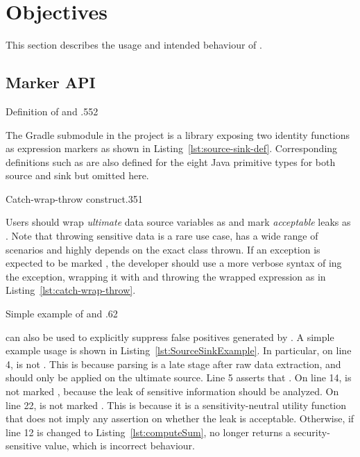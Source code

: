 \section{Objectives}\label{sec:objectives}
This section describes the usage and intended behaviour of \pname{}.

\subsection{Marker API}\label{subsec:marker-api}
{Definition of  and }{.55}{2}

The  Gradle submodule in the project
is a library exposing two identity functions as expression markers
as shown in Listing~\ref{lst:source-sink-def}.
Corresponding definitions such as 
are also defined for the eight Java primitive types
for both source and sink but omitted here.

{Catch-wrap-throw construct}{.35}{1}

Users should wrap \emph{ultimate} data source variables as 
and mark \emph{acceptable} leaks as .
Note that throwing sensitive data is a rare use case,
has a wide range of scenarios
and highly depends on the exact class thrown.
If an exception is expected to be marked ,
the developer should use a more verbose syntax of ing the exception,
wrapping it with  and throwing the wrapped expression
as in Listing~\ref{lst:catch-wrap-throw}.

{Simple example of  and }{.6}{2}

 can also be used to explicitly suppress false positives generated by \pname{}.
A simple example usage is shown in Listing~\ref{lst:SourceSinkExample}.
In particular, on line 4,  is not .
This is because parsing is a late stage after raw data extraction,
and  should only be applied on the ultimate source.
Line 5 asserts that .
On line 14,  is not marked ,
because the leak of sensitive information should be analyzed.
On line 22,  is not marked .
This is because it is a sensitivity-neutral utility function
that does not imply any assertion on whether the leak is acceptable.
Otherwise, if line 12 is changed to Listing~\ref{lst:computeSum},
 no longer returns a security-sensitive value,
which is incorrect behaviour.

